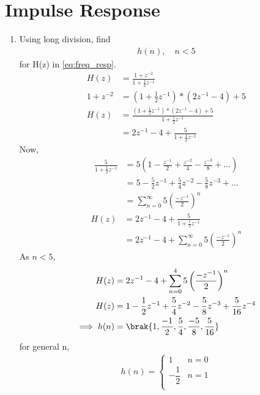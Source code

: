 \documentclass[journal,12pt,twocolumn]{IEEEtran}
\renewcommand\thesection{\arabic{section}}
\begin{document}
\section{Impulse Response}
\begin{enumerate}[label=\thesection.\arabic*]
	\item Using long division, 
	find
	\begin{align}
		h(n), \quad n < 5
	\end{align}
	for H(z) in 
	\eqref{eq:freq_resp}.\\
	\solution
	\begin{align}
		H(z) &= \frac{1 + z^{-2}}{1 + \frac{1}{2}z^{-1}} \\
		1+z^{-2} &= \left(1 + \frac{1}{2}z^{-1}\right)*\left(2z^{-1}-4\right) + 5 \\
		H(z)&= \frac{\left(1 + \frac{1}{2}z^{-1}\right)*\left(2z^{-1}-4\right) + 5}{1 + \frac{1}{2}z^{-1}} \\
		&= 2z^{-1}-4 + \frac{5}{1 + \frac{1}{2}z^{-1}}
	\end{align}
	Now,
	\begin{align}
		\frac{5}{1 + \frac{1}{2}z^{-1}} &= 5\left(1-\frac{z^{-1}}{2}+\frac{z^{-2}}{4}-\frac{z^{-3}}{8}+\dots\right) \\
		&= 5-\frac{5}{2}z^{-1}+\frac{5}{4}z^{-2}-\frac{5}{8}z^{-3}+\dots \\
		&= \sum_{n = 0}^{\infty}  5 \left(\frac{-z^{-1}}{2}\right)^n
	\end{align}
	\begin{align}
		H(z)&= 2z^{-1}-4 + \frac{5}{1 + \frac{1}{2}z^{-1}} \\
		&= 2z^{-1}-4 + \sum_{n = 0}^{\infty}  5 \left(\frac{-z^{-1}}{2}\right)^n 
	\end{align}
	As $n<5$,
	\begin{align}
		H(z) &= 2z^{-1}-4 + \sum_{n = 0}^{4}  5 \left(\frac{-z^{-1}}{2}\right)^n \\
		H(z) &= 1-\frac{1}{2}z^{-1}+\frac{5}{4}z^{-2}-\frac{5}{8}z^{-3}+\frac{5}{16}z^{-4} \\
		\implies h(n) &= \brak{1, \frac{-1}{2}, \frac{5}{4}, \frac{-5}{8}, \frac{5}{16}}
	\end{align}
	for general n,
	\begin{align}
		h(n) = 
		\begin{cases}
			1 & n = 0 \\
			-\dfrac{1}{2} & n = 1 \\

\end{cases}
\end{align}
\end{enumerate}
\end{document}
